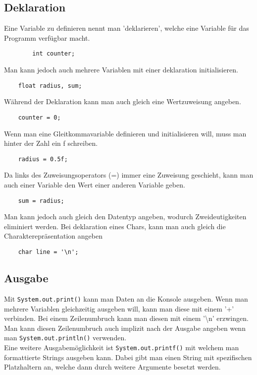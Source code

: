 \documentclass{article}
\begin{document}
	\subsection{Deklaration}
	Eine Variable zu definieren nennt man 'deklarieren', welche eine Variable für das Programm verfügbar macht.
	\begin{verbatim}
		int counter;
	\end{verbatim}
	Man kann jedoch auch mehrere Variablen mit einer deklaration initialisieren.
	\begin{verbatim}
	float radius, sum;
	\end{verbatim}
	Während der Deklaration kann man auch gleich eine Wertzuweisung angeben.
	\begin{verbatim}
	counter = 0;
	\end{verbatim}
	Wenn man eine Gleitkommavariable definieren und initialisieren will, muss man hinter der Zahl ein f schreiben.
	\begin{verbatim}
	radius = 0.5f;
	\end{verbatim}
	Da links des Zuweisungsoperators (=) immer eine Zuweisung geschieht, kann man auch einer Variable den Wert einer anderen Variable geben. 	
	\begin{verbatim}
	sum = radius;
	\end{verbatim}
	Man kann jedoch auch gleich den Datentyp angeben, wodurch Zweideutigkeiten eliminiert werden. Bei deklaration eines Chars, kann man auch gleich die Charakterepräsentation angeben
	\begin{verbatim}
	char line = '\n';
	\end{verbatim}
	\subsection{Ausgabe}
	Mit \verb|System.out.print()| kann man Daten an die Konsole ausgeben. Wenn man mehrere Variablen gleichzeitig ausgeben will, kann man diese mit einem '+' verbinden. Bei einem Zeilenumbruch kann man diesen mit einem '\textbackslash n' erzwingen.\\
	Man kann diesen Zeilenumbruch auch implizit nach der Ausgabe angeben wenn man \verb|System.out.println()| verwenden. \\
	Eine weitere Ausgabemöglichkeit ist \verb|System.out.printf()| mit welchem man formattierte Strings ausgeben kann. Dabei gibt man einen String mit spezifischen Platzhaltern an, welche dann durch weitere Argumente besetzt werden.
\end{document}
